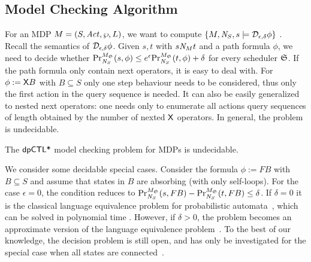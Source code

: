 \subsection{Model Checking Algorithm}
For an MDP $M =
(S, \Act, \wp, L)$, we want to compute $\{ M, \neighbor{S}, s \models
\dpriv{\epsilon}{\delta} \phi \}$ . Recall the semantics of $\dpriv{\epsilon}{\delta}
\phi$. Given $s, t$ with $s \neighbor{M} t$ and a path formula
$\phi$, we need to decide whether
$\myPr{s}{M_{\scheduler{S}}}{\neighbor{S}}{\phi} \leq
e^{\epsilon} \myPr{t}{M_{\scheduler{S}}}{\neighbor{S}}{\phi} + \delta$
for every scheduler $\scheduler{S}$.
If the path formula only contain next operators, it is easy to deal with. For $\phi:=\X B$ with $B\subseteq S$ only one step behaviour needs to be considered, thus only the first action in the query sequence is needed. It can also be easily generalized to nested next operators:  one needs only to enumerate
all actions query sequences of length obtained by the number of nexted $\X$ operators.
In general, the problem is undecidable.

\begin{theorem}
The $\dpCTLstar$ model checking problem for MDPs  is undecidable.
\end{theorem}

We consider some decidable special cases. Consider the formula $\phi:=F B$ with $B\subseteq S$ and assume that states in $B$ are absorbing (with only self-loops). For the case $\epsilon=0$, the condition reduces to
$\myPr{s}{M_{\scheduler{S}}}{\neighbor{S}}{F B} -
\myPr{t}{M_{\scheduler{S}}}{\neighbor{S}}{F B}\le \delta$. If $\delta=0$ it is the classical language equivalence problem for probabilistic automata~\cite{Rabin63}, which can be solved in polynomial time \cite{Tzeng92}. However, if $\delta>0$, the problem
becomes an approximate version of the language equivalence problem~\cite{Tzeng92}. To the best of our knowledge, the decision problem is still open, and has only be investigated for the special case when all states are connected~\cite{Tzeng92}.


